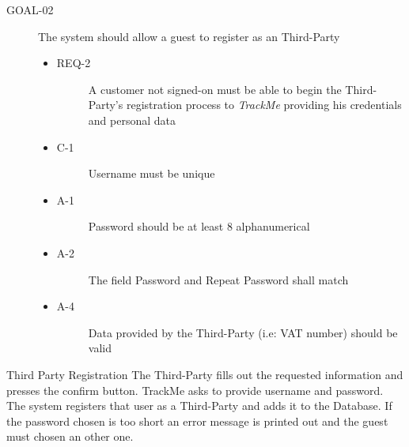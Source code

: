 \documentclass[a4paper]{article}
\newcommand{\requirement}{\ding{229}}%
\begin{document}
        \begin{description}
        	\item[GOAL-02] The system should allow a guest to register as an Third-Party 
            	\begin{itemize}
            	    \item[\requirement]
                	\begin{description}
                	\item[REQ-2] A customer not signed-on must be able to begin the Third-Party's registration process to \textit{TrackMe} providing his credentials and personal data
                	\end{description}
                	\item
                	\begin{description}
                	\item[C-1] Username must be unique
                	\end{description}
                	\item
                	\begin{description}
                	\item[A-1] Password should be at least 8 alphanumerical
                	\end{description}
                	\item
                	\begin{description}
                	\item[A-2] The field Password and Repeat Password shall match
                	\end{description}
            	    \item
                	\begin{description}
                	\item[A-4] Data provided by the Third-Party (i.e: VAT number) should be valid
                	\end{description}
                \end{itemize}
        \end{description}
        
        
        \begin{usecase}{Third Party Registration}
              {The Third-Party fills out the requested information and presses the confirm button.}
               {TrackMe asks to provide username and password.}
              {The system registers that user as a Third-Party and adds it to the  Database.}
        {If the password chosen is too short an error message is printed out and the guest must chosen an other one.}
      \end{usecase}
        
\end{document}
